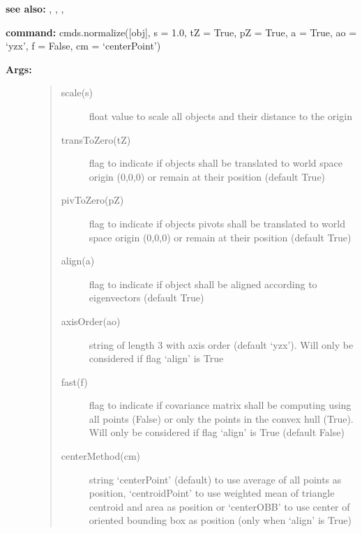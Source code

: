 \documentclass[letterpaper,10pt,english]{sphinxmanual}
\begin{document}
\textbf{see also:} {\hyperref[pk_src.alignObj:alignobj]{}}, {\hyperref[pk_src.eigenvector:eigenvector]{}}, {\hyperref[pk_src.centerPoint:centerpoint]{}}, {\hyperref[pk_src.centroidPoint:centroidpoint]{}}

\textbf{command:} cmds.normalize({[}obj{]}, s = 1.0, tZ = True, pZ = True, a = True, ao = `yzx', f = False, cm = `centerPoint')
\begin{description}
\item[{\textbf{Args:}}] \leavevmode\begin{quote}\begin{description}
\item[{scale(s)}] \leavevmode
float value to scale all objects and their distance to the origin

\item[{transToZero(tZ)}] \leavevmode
flag to indicate if objects shall be translated to world space origin (0,0,0) or remain at their position (default True)

\item[{pivToZero(pZ)}] \leavevmode
flag to indicate if objects pivots shall be translated to world space origin (0,0,0) or remain at their position (default True)

\item[{align(a)}] \leavevmode
flag to indicate if object shall be aligned according to eigenvectors (default True)

\item[{axisOrder(ao)}] \leavevmode
string of length 3 with axis order (default `yzx'). Will only be considered if flag `align' is True

\item[{fast(f)}] \leavevmode
flag to indicate if covariance matrix shall be computing using all points (False) or only the points in the convex hull (True). Will only be considered if flag `align' is True (default False)

\item[{centerMethod(cm)}] \leavevmode
string `centerPoint' (default) to use average of all points as position, `centroidPoint' to use weighted mean of triangle centroid and area as position or `centerOBB' to use center of oriented bounding box as position (only when `align' is True)

\end{description}\end{quote}

\end{description}
\end{document}
